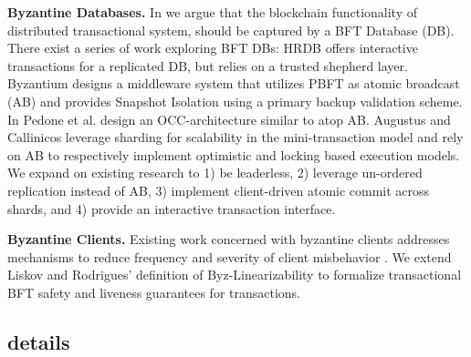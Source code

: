 \par \textbf{Byzantine Databases.} In \sys we argue that the blockchain functionality of distributed transactional system, should be captured by a BFT Database (DB). There exist a series of work exploring BFT DBs: HRDB \cite{vandiver2007tolerating} offers interactive transactions for a replicated DB, but relies on a trusted shepherd layer. Byzantium \cite{garcia2011efficient} designs a middleware system that utilizes PBFT as atomic broadcast (AB) and provides Snapshot Isolation using a primary backup validation scheme. In \cite{pedone2012byzantine} Pedone et al. design an OCC-architecture similar to \sys atop AB. Augustus \cite{padilha2013augustus} and Callinicos \cite{padilha2016callinicos} leverage sharding for scalability in the mini-transaction model \cite{aguilera2007sinfonia} and rely on AB to respectively implement optimistic and locking based execution models.
We expand on existing research to 1) be leaderless, 2) leverage un-ordered replication instead of AB, 3) implement client-driven atomic commit across shards, and 4) provide an interactive transaction interface.
\par \textbf{Byzantine Clients.}
Existing work concerned with byzantine clients addresses mechanisms to reduce frequency and severity of client misbehavior \cite{liskov2006tolerating, garcia2011efficient, pedone2012byzantine, padilha2013augustus, padilha2016callinicos, luiz2011byzantine, }. We extend Liskov and Rodrigues' \cite{liskov2006tolerating} definition of Byz-Linearizability to formalize transactional BFT safety and liveness guarantees for transactions. 


\iffalse
{}














\subsection{details}


